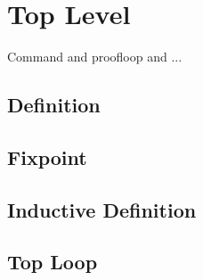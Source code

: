 \section{Top Level}

Command and proofloop and ...



\subsection{Definition}

\subsection{Fixpoint}

\subsection{Inductive Definition}

\subsection{Top Loop}
